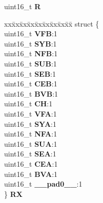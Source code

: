 \begin{DoxyCompactItemize}
\begin{tabbing}
\end{tabbing}\item 
\mbox{\label{unionuS__STSTUS_a01b7ae2b2f456c0320ddaa83e77f8ee0}} 
uint16\+\_\+t {\bfseries R}
\item 
\mbox{\label{unionuS__STSTUS_a16c23746021c8a65221e6f56348c4bde}} 
\begin{tabbing}
xx\=xx\=xx\=xx\=xx\=xx\=xx\=xx\=xx\=\kill
struct \{\\
\>uint16\_t {\bfseries VFB}:1\\
\>uint16\_t {\bfseries SYB}:1\\
\>uint16\_t {\bfseries NFB}:1\\
\>uint16\_t {\bfseries SUB}:1\\
\>uint16\_t {\bfseries SEB}:1\\
\>uint16\_t {\bfseries CEB}:1\\
\>uint16\_t {\bfseries BVB}:1\\
\>uint16\_t {\bfseries CH}:1\\
\>uint16\_t {\bfseries VFA}:1\\
\>uint16\_t {\bfseries SYA}:1\\
\>uint16\_t {\bfseries NFA}:1\\
\>uint16\_t {\bfseries SUA}:1\\
\>uint16\_t {\bfseries SEA}:1\\
\>uint16\_t {\bfseries CEA}:1\\
\>uint16\_t {\bfseries BVA}:1\\
\>uint16\_t {\bfseries \_\_pad0\_\_}:1\\
\} {\bfseries RX}\\


\end{tabbing}
\end{DoxyCompactItemize}
